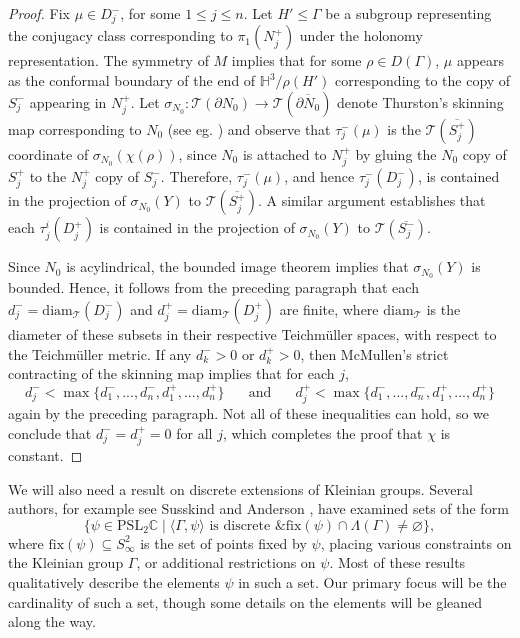 \documentclass[11pt,leqno]{article}
\theoremstyle{introdef}
\numberwithin{lemma}{section}
\theoremstyle{definition}
\newcommand{\C}{\mathbb{C}}
\begin{document}
\begin{proof}
     Fix $\mu\in D_j^-$, for some $1\leq j\leq n$. Let $H'\leq\Gamma$ be a subgroup representing the conjugacy class corresponding to $\pi_1(N_j^+)$ under the holonomy representation. The symmetry of $M$ implies that for some $\rho\in D(\Gamma)$, $\mu$ appears as the conformal boundary of the end of $\mathbb{H}^3/\rho(H')$ corresponding to the copy of $S_j^-$ appearing in $N_j^+$. Let $\sigma_{N_0}:\mathcal{T}(\partial N_0)\rightarrow\mathcal{T}(\overline{\partial N_0})$ denote Thurston's skinning map corresponding to $N_0$ (see eg. \cite{KENT}) and observe that $\tau_j^-(\mu)$ is the $\mathcal{T}(\overline{S_j^+})$ coordinate of $\sigma_{N_0}(\chi(\rho))$, since $N_0$ is attached to $N_j^+$ by gluing the $N_0$ copy of $S_j^+$ to the $N_j^+$ copy of $S_j^-$. Therefore, $\tau_j^-(\mu)$, and hence $\tau_j^-(D_j^-)$, is contained in the projection of $\sigma_{N_0}(Y)$ to $\mathcal{T}(\overline{S_j^+})$. A similar argument establishes that each $\tau_j^i(D_j^+)$ is contained in the projection of $\sigma_{N_0}(Y)$ to $\mathcal{T}(\overline{S_j^-})$.\par

     Since $N_0$ is acylindrical, the bounded image theorem \cite{KENT} implies that $\sigma_{N_0}(Y)$ is bounded. Hence, it follows from the preceding paragraph that each $d_j^-=\mathrm{diam}_{\mathcal{T}}(D_j^-)$ and $d_j^+=\mathrm{diam}_{\mathcal{T}}(D_j^+)$ are finite, where $\mathrm{diam}_\mathcal{T}$ is the diameter of these subsets in their respective Teichm\"{u}ller spaces, with respect to the Teichm\"{u}ller metric. If any $d_k^->0$ or $d_k^+>0$, then McMullen's strict contracting of the skinning map \cite{MCM} implies that for each $j$, \[d_j^- < \max\{d_1^-,...,d_n^-,d_1^+,...,d_n^+\}\;\;\;\;\;\text{ and }\;\;\;\;\; d_j^+ < \max\{d_1^-,...,d_n^-,d_1^+,...,d_n^+\}\]  again by the preceding paragraph. Not all of these inequalities can hold, so we conclude that $d_j^-=d_j^+=0$ for all $j$, which completes the proof that $\chi$ is constant.
\end{proof}


We will also need a result on discrete extensions of Kleinian groups. Several authors, for example see Susskind \cite{SUSS} and Anderson \cite{ANDER}, have examined sets of the form \[\{\psi\in\mathrm{PSL}_2\C \;|\; \langle\Gamma,\psi\rangle\text{ is discrete \& }\mathrm{fix}(\psi)\cap\Lambda(\Gamma)\neq\varnothing\},\] where $\mathrm{fix}(\psi)\subseteq S^2_\infty$ is the set of points fixed by $\psi$, placing various constraints on the Kleinian group $\Gamma$, or additional restrictions on $\psi$. Most of these results qualitatively describe the elements $\psi$ in such a set. Our primary focus will be the cardinality of such a set, though some details on the elements will be gleaned along the way.\par
\end{document}
